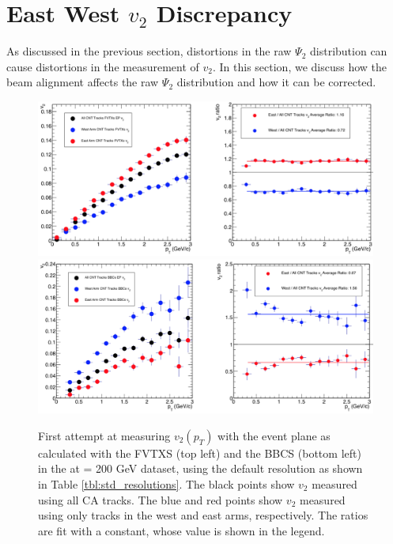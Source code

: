 \section{East West $v_2$ Discrepancy}
As discussed in the previous section, distortions in the raw $\Psi_2$ distribution can cause distortions in the measurement of $v_2$. In this section, we discuss how the beam alignment affects the raw $\Psi_2$ distribution and how it can be corrected.
\begin{figure}[!h]
\centering
\includegraphics[width=0.85\linewidth]{figs/fvtxs_default_ew.png}
\includegraphics[width=0.85\linewidth]{figs/bbcs_default_ew.png}
\caption{First attempt at measuring $v_{2} (p_T)$ with the event plane as calculated with the FVTXS (top left) and the BBCS (bottom left) in the \pau at \sqsn = 200 GeV dataset, using the default resolution as shown in Table \ref{tbl:std_resolutions}. The black points show $v_2$ measured using all CA tracks. The blue and red points show $v_2$ measured using only tracks in the west and east arms, respectively. The ratios are fit with a constant, whose value is shown in the legend.}
\label{fig:fvtx_ew_default}
\end{figure}

